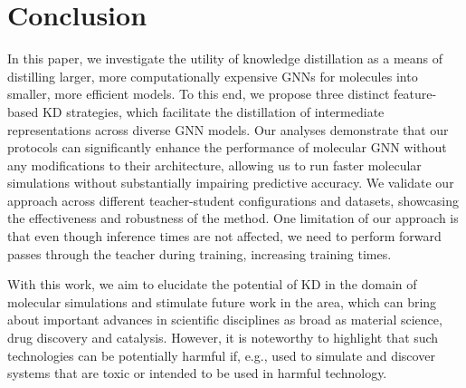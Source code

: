 \documentclass{article}
\begin{document}
\section{Conclusion}
In this paper, we investigate the utility of knowledge distillation as a means of distilling larger, more computationally expensive GNNs for molecules into smaller, more efficient models. To this end, we propose three distinct feature-based KD strategies, which facilitate the distillation of intermediate representations across diverse GNN models. Our analyses demonstrate that our protocols can significantly enhance the performance of molecular GNN without any modifications to their architecture, allowing us to run faster molecular simulations without substantially impairing predictive accuracy. We validate our approach across different teacher-student configurations and datasets, showcasing the effectiveness and robustness of the method. One limitation of our approach is that even though inference times are not affected, we need to perform forward passes through the teacher during training, increasing training times.

With this work, we aim to elucidate the potential of KD in the domain of molecular simulations and stimulate future work in the area, which can bring about important advances in scientific disciplines as broad as material science, drug discovery and catalysis. However, it is noteworthy to highlight that such technologies can be potentially harmful if, e.g., used to simulate and discover systems that are toxic or intended to be used in harmful technology.


\end{document}
